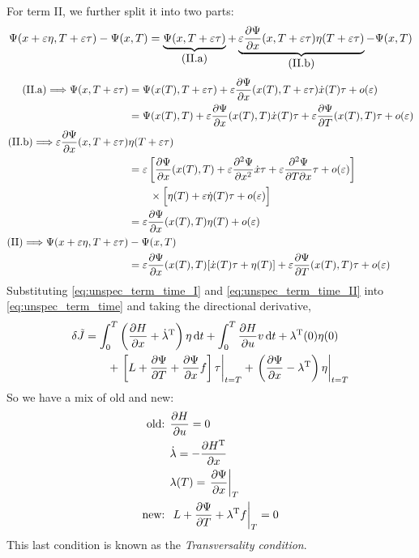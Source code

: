 For term II, we further split it into two parts:
\begin{gather}
  \Psi(x+\varepsilon\eta,T+\varepsilon\tau) - \Psi(x,T) = \underbrace{\Psi(x,T+\varepsilon\tau)}_{\displaystyle\text{(II.a)}} + \underbrace{\varepsilon\frac{\partial \Psi}{\partial x}(x,T+\varepsilon\tau)\eta(T+\varepsilon\tau)}_{\displaystyle\text{(II.b)}} - \Psi(x,T)
\end{gather}
\begin{align}
  \text{(II.a)}\Longrightarrow \Psi(x,T+\varepsilon\tau) &= \Psi(x(T),T+\varepsilon\tau) + \varepsilon\frac{\partial \Psi}{\partial x}(x(T),T+\varepsilon\tau)\dot x(T)\tau + o(\varepsilon) \\
                                                         &= \Psi(x(T),T) + \varepsilon\frac{\partial \Psi}{\partial x}(x(T),T)\dot x(T)\tau + \varepsilon\frac{\partial \Psi}{\partial T}(x(T),T)\tau + o(\varepsilon) \\
  \text{(II.b)}\Longrightarrow \varepsilon\frac{\partial \Psi}{\partial x}(x,T+\varepsilon\tau) & \eta(T+\varepsilon\tau) \\
                                                         & = \varepsilon \left[ \frac{\partial \Psi}{\partial x}(x(T),T) + \varepsilon\frac{\partial ^2\Psi}{\partial x^2}\dot x\tau + \varepsilon\frac{\partial ^2\Psi}{\partial T\partial x}\tau + o(\varepsilon) \right] \\
                                                         & \qquad \times \Big[\eta(T) + \varepsilon\dot\eta(T)\tau + o(\varepsilon)\Big] \\
                                                         &= \varepsilon\frac{\partial \Psi}{\partial x}(x(T),T)\eta(T) + o(\varepsilon) \\
  \text{(II)} \Longrightarrow  \Psi(x+\varepsilon\eta,T+\varepsilon\tau) & - \Psi(x,T) \\
                                                         &= \varepsilon\frac{\partial \Psi}{\partial x}(x(T),T)[\dot x(T)\tau + \eta(T)] + \varepsilon\frac{\partial \Psi}{\partial T}(x(T),T)\tau + o(\varepsilon) \label{eq:unspec_term_time_II}
\end{align}
Substituting \eqref{eq:unspec_term_time_I} and \eqref{eq:unspec_term_time_II} into \eqref{eq:unspec_term_time} and taking the directional derivative,
\begin{align}
  \delta\tilde J &= \int_0^T \left(\frac{\partial H}{\partial x}+\dot\lambda^\text{T}\right)\eta\mathop{}\!\mathrm{d} t + \int_0^T\frac{\partial H}{\partial u}v\mathop{}\!\mathrm{d} t + \lambda^\text{T}(0)\eta(0) \\
                 & \qquad + \left. \left[L + \frac{\partial \Psi}{\partial T} + \frac{\partial \Psi}{\partial x} f\right] \tau \right|_{t=T} + \left. \left(\frac{\partial \Psi}{\partial x} - \lambda^\text{T}\right)\eta \right|_{t=T}
\end{align}
So we have a mix of old and new:
\begin{align}
  \text{old: } & \frac{\partial H}{\partial u} = 0 \\
               & \dot\lambda = -\frac{\partial H^\text{T}}{\partial x} \\
               & \lambda(T) = \left. \frac{\partial \Psi}{\partial x} \right|_T \\
  \text{new: } & \left. L + \frac{\partial \Psi}{\partial T} + \lambda^\text{T} f \right|_T = 0
\end{align}
This last condition is known as the \emph{Transversality condition}.

